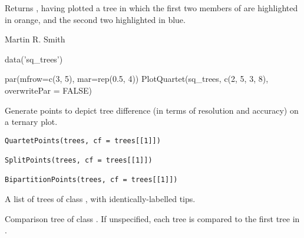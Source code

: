 \documentclass[a4paper]{book}
\begin{document}
%
\begin{Value}
Returns , having plotted a tree in which the first two members
of  are highlighted in orange, and the second two highlighted in
blue.
\end{Value}
%
\begin{Author}\relax
Martin R. Smith
\end{Author}
%
\begin{Examples}
\begin{ExampleCode}
  data('sq_trees')
  
  par(mfrow=c(3, 5), mar=rep(0.5, 4))
  PlotQuartet(sq_trees, c(2, 5, 3, 8), overwritePar = FALSE)

\end{ExampleCode}
\end{Examples}
%
\begin{Description}\relax
Generate points to depict tree difference (in terms of resolution
and accuracy) on a ternary plot.
\end{Description}
%
\begin{Usage}
\begin{verbatim}
QuartetPoints(trees, cf = trees[[1]])

SplitPoints(trees, cf = trees[[1]])

BipartitionPoints(trees, cf = trees[[1]])
\end{verbatim}
\end{Usage}
%
\begin{Arguments}
\begin{ldescription}
\item[\code{trees}] A list of trees of class , with identically-labelled tips.

\item[\code{cf}] Comparison tree of class .  If unspecified,
each tree is compared to the first tree in .
\end{ldescription}
\end{Arguments}
%
\end{document}
